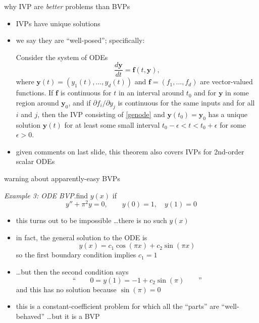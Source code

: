 \documentclass[10pt,hyperref]{beamer}
\newcommand{\by}{\mathbf{y}}
\newcommand{\bbf}{\mathbf{f}}
\newcommand{\eps}{\epsilon}
\begin{document}
\begin{frame}{why IVP are \emph{better} problems than BVPs} 

\begin{itemize}
\item \alert{IVPs have unique solutions}
\item we say they are ``well-posed''; specifically:

\begin{theorem}
 Consider the system of ODEs
\begin{equation}\label{genode}
\frac{d\by}{dt} = \bbf(t,\by),
\end{equation}
where $\by(t)=(y_1(t),\dots,y_d(t))$ and $\bbf=(f_1,\dots,f_d)$ are vector-valued functions.  If $\bbf$ is continuous for $t$ in an interval around $t_0$ and for $\by$ in some region around $\by_0$, and if $\partial f_i/\partial y_j$ is continuous for the same inputs and for all $i$ and $j$, then the IVP consisting of \eqref{genode} and $\by(t_0)=\by_0$ has a unique solution $\by(t)$ for at least some small interval $t_0-\eps < t < t_0+\eps$ for some $\eps>0$.
\end{theorem}

\item given comments on last slide, this theorem also covers IVPs for 2nd-order scalar ODEs
\end{itemize}
\end{frame}

\begin{frame}{warning about apparently-easy BVPs} 

\noindent\emph{Example 3: ODE BVP}.\qquad find $y(x)$ if
  	$$y'' + \pi^2 y = 0, \qquad y(0)=1, \quad y(1)=0$$

\begin{itemize}
\item this turns out to be \alert{impossible} \dots there is no such $y(x)$
\item in fact, the general solution to the ODE is
	$$y(x) = c_1 \cos(\pi x) + c_2 \sin(\pi x)$$
so the first boundary condition implies $c_1=1$
\item \dots but then the second condition says
	$$\text{``}\qquad 0 = y(1) = -1 + c_2 \sin(\pi) \qquad \text{''}$$
and this has no solution because $\sin(\pi)=0$
\item this is a constant-coefficient problem for which all the ``parts'' are ``well-behaved'' \dots but it is a BVP
\end{itemize}
\end{frame}
\end{document}
